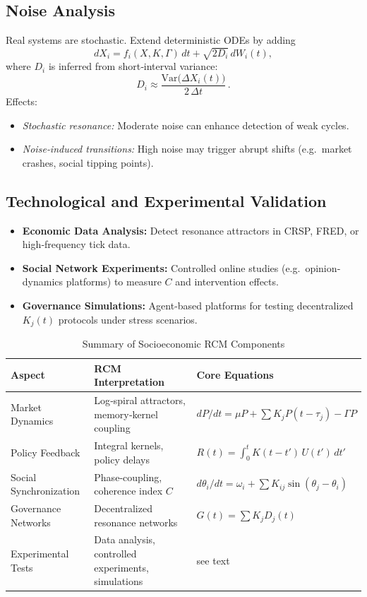 \subsection{Noise Analysis}
Real systems are stochastic. Extend deterministic ODEs by adding
\[
dX_i
= f_i(X,K,\Gamma)\,dt
+ \sqrt{2D_i}\,dW_i(t),
\]
where $D_i$ is inferred from short‐interval variance:
\[
D_i \approx \frac{\mathrm{Var}\bigl(\Delta X_i(t)\bigr)}{2\,\Delta t}\,.
\]
Effects:
\begin{itemize}
  \item \emph{Stochastic resonance:} Moderate noise can enhance detection of weak cycles.  
  \item \emph{Noise‐induced transitions:} High noise may trigger abrupt shifts (e.g.\ market crashes, social tipping points).
\end{itemize}

\subsection{Technological and Experimental Validation}
\begin{itemize}
  \item \textbf{Economic Data Analysis:} Detect resonance attractors in CRSP, FRED, or high‐frequency tick data.  
  \item \textbf{Social Network Experiments:} Controlled online studies (e.g.\ opinion‐dynamics platforms) to measure $C$ and intervention effects.  
  \item \textbf{Governance Simulations:} Agent‐based platforms for testing decentralized $K_j(t)$ protocols under stress scenarios.
\end{itemize}

\begin{table}[ht]
  \centering
  \caption{Summary of Socioeconomic RCM Components}
  \label{tab:eco_summary}
  \begin{tabular}{@{}lll@{}}
    \toprule
    Aspect                 & RCM Interpretation                               & Core Equations \\
    \midrule
    Market Dynamics        & Log‐spiral attractors, memory‐kernel coupling    & $dP/dt=\mu P+\sum K_j P(t-\tau_j)-\Gamma P$ \\
    Policy Feedback        & Integral kernels, policy delays                  & $R(t)=\int_0^t K(t-t')\,U(t')\,dt'$ \\
    Social Synchronization & Phase‐coupling, coherence index $C$              & $d\theta_i/dt=\omega_i+\sum K_{ij}\sin(\theta_j-\theta_i)$ \\
    Governance Networks    & Decentralized resonance networks                 & $G(t)=\sum K_j D_j(t)$ \\
    Experimental Tests     & Data analysis, controlled experiments, simulations & see text \\
    \bottomrule
  \end{tabular}
\end{table}


